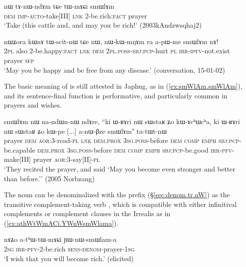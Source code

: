 \begin{exe}
	\ex \label{ex:tWmACi.smWlAm}
	\gll  nɯ tɤ-nɯ-ndɤm tɕe tɯ-mɤɕi smɯlɤm  \\
	\textsc{dem} \textsc{imp}-\textsc{auto}-take[III] \textsc{lnk} 2-be.rich:\textsc{fact} prayer \\
	\glt `Take (this cattle and, and may you be rich!' (2003kAndzwsqhaj2)
\end{exe}

\begin{exe}
	\ex \label{ex:tWscitnW.nWkWmNAm.smWlAm}
	\gll    nɯʑora kɯnɤ tɯ-scit-nɯ tɕe nɯ, nɯ-kɯ-mŋɤm ra a-pɯ-me smɯlɤm nɤ! \\
	\textsc{2pl} also 2-be.happy:\textsc{fact} \textsc{lnk} \textsc{dem} \textsc{2pl}.\textsc{poss}-\textsc{sbj}:\textsc{pcp}-hurt \textsc{pl} \textsc{irr}-\textsc{ipfv}-not.exist prayer \textsc{sfp} \\
	\glt `May you be happy and be free from any disease.' (conversation, 15-01-02)
\end{exe}

The basic meaning of   is still attested in Japhug, as in (\ref{ex:smWlAm.smWlAm}), and its sentence-final function is performative, and particularly common in prayers and wishes.

\begin{exe}
	\ex \label{ex:smWlAm.smWlAm}
	\gll    smɯlɤm nɯ na-ndɯn-nɯ ndɤre, ``ki ɯ-ʁɤri nɯ sɯstaʁ ʑo kɯ-ɤcʰɯcʰa, ki ɯ-ʁɤri nɯ sɯstaʁ ʑo kɯ-pe [...] a-nɯ-βze smɯlɤm" ta-tɯt-nɯ \\
	prayer \textsc{dem} \textsc{aor}:3\flobv{}-read-\textsc{pl}  \textsc{lnk} \textsc{dem}.\textsc{prox} \textsc{3sg}.\textsc{poss}-before \textsc{dem} \textsc{comp} \textsc{emph} \textsc{sbj}:\textsc{pcp}-be.capable \textsc{dem}.\textsc{prox} \textsc{3sg}.\textsc{poss}-before  \textsc{dem} \textsc{comp}  \textsc{emph} \textsc{sbj}:\textsc{pcp}-be.good  {   } \textsc{irr}-\textsc{pfv}-make[III] prayer  \textsc{aor}:3\flobv{}-say[II]-\textsc{pl} \\
	\glt `They recited the prayer, and said `May you become even stronger and better than before.'' (2005 Norbzang)
\end{exe}  

The noun  can be denominalized with the prefix  (§\ref {sec:denom.tr.nW}) as the transitive com\-ple\-ment-taking verb , which is compatible with either infinitival complements or complement clauses in the Irrealis as in (\ref{ex:athWtWmACi.YWnWsmWlama}).

\begin{exe}
	\ex \label{ex:athWtWmACi.YWnWsmWlama}
	\gll  nɤʑo a-tʰɯ-tɯ-mɤɕi  ɲɯ-nɯ-smɯlam-a \\
	\textsc{2sg} \textsc{irr}-\textsc{pfv}-2-be.rich \textsc{sens}-\textsc{denom}-prayer-\textsc{1sg} \\
	\glt `I wish that you will become rich.' (elicited)
\end{exe}  
